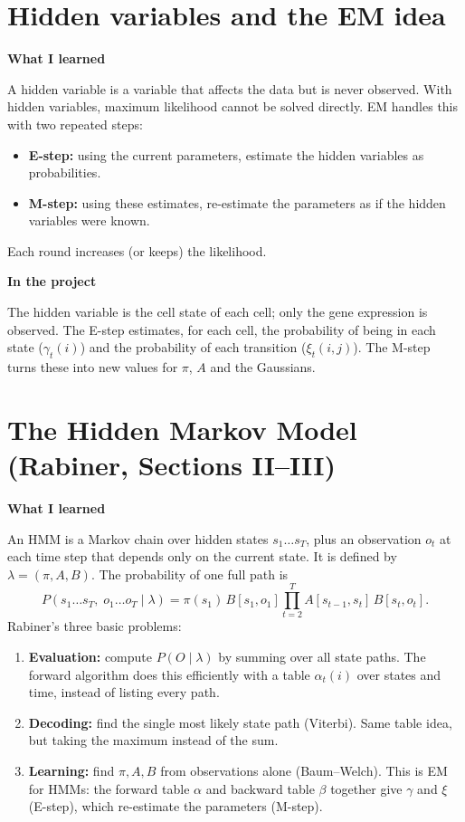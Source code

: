 \documentclass[10pt,a4paper]{article}
\newcommand{\sub}[1]{\vspace{1pt}\textbf{\textcolor{gray!80!black}{#1}}\par}
\begin{document}
\section{Hidden variables and the EM idea}

\sub{What I learned}
A hidden variable is a variable that affects the data but is never observed. With hidden variables, maximum likelihood cannot be solved directly. EM handles this with two repeated steps:
\begin{itemize}
  \item \textbf{E-step:} using the current parameters, estimate the hidden variables as probabilities.
  \item \textbf{M-step:} using these estimates, re-estimate the parameters as if the hidden variables were known.
\end{itemize}
Each round increases (or keeps) the likelihood.

\sub{In the project}
The hidden variable is the cell state of each cell; only the gene expression is observed. The E-step estimates, for each cell, the probability of being in each state ($\gamma_t(i)$) and the probability of each transition ($\xi_t(i,j)$). The M-step turns these into new values for $\pi$, $A$ and the Gaussians.

\section{The Hidden Markov Model (Rabiner, Sections II--III)}

\sub{What I learned}
An HMM is a Markov chain over hidden states $s_1 \dots s_T$, plus an observation $o_t$ at each time step that depends only on the current state. It is defined by $\lambda = (\pi, A, B)$. The probability of one full path is
\[
P(s_1 \dots s_T,\; o_1 \dots o_T \mid \lambda) = \pi(s_1)\, B[s_1, o_1] \prod_{t=2}^{T} A[s_{t-1}, s_t]\, B[s_t, o_t].
\]
Rabiner's three basic problems:
\begin{enumerate}
  \item \textbf{Evaluation:} compute $P(O \mid \lambda)$ by summing over all state paths. The forward algorithm does this efficiently with a table $\alpha_t(i)$ over states and time, instead of listing every path.
  \item \textbf{Decoding:} find the single most likely state path (Viterbi). Same table idea, but taking the maximum instead of the sum.
  \item \textbf{Learning:} find $\pi, A, B$ from observations alone (Baum--Welch). This is EM for HMMs: the forward table $\alpha$ and backward table $\beta$ together give $\gamma$ and $\xi$ (E-step), which re-estimate the parameters (M-step).
\end{enumerate}
\end{document}
